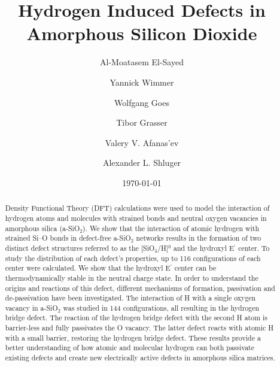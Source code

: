 \documentclass[aps,prb,reprint,superscriptaddress,showpacs]{revtex4-1}
\begin{document}
\title{Hydrogen Induced Defects in Amorphous Silicon Dioxide}
    
\author{Al-Moatasem El-Sayed}
\author{Yannick Wimmer}
\author{Wolfgang Goes}
\author{Tibor Grasser}
\author{Valery V. Afanas'ev}
\author{Alexander L. Shluger}

\date{\today}
\begin{abstract}
Density Functional Theory (DFT) calculations were used to model the interaction of hydrogen atoms and molecules with strained bonds and neutral oxygen vacancies in amorphous silica (a-SiO$_2$). We show that the interaction of atomic hydrogen with strained \mbox{Si--O} bonds in defect-free a-SiO$_2$ networks results in the formation of two distinct defect structures referred to as the [SiO$_4$/H]$^0$ and the hydroxyl E$^\prime$ center. To study the distribution of each defect's properties, up to 116 configurations of each center were calculated. We show that the hydroxyl E$^\prime$ center can be thermodynamically stable in the neutral charge state. In order to understand the origins and reactions of this defect, different mechanisms of formation, passivation and de-passivation have been investigated. The interaction of H with a single oxygen vacancy in a-SiO$_2$ was studied in 144 configurations, all resulting in the hydrogen bridge defect. The reaction of the hydrogen bridge defect with the second H atom is barrier-less and fully passivates the O vacancy. The latter defect reacts with atomic H with a small barrier, restoring the hydrogen bridge defect. These results provide a better understanding of how atomic and molecular hydrogen can both passivate existing defects and create new electrically active defects in amorphous silica matrices.

\end{abstract}
\end{document}
